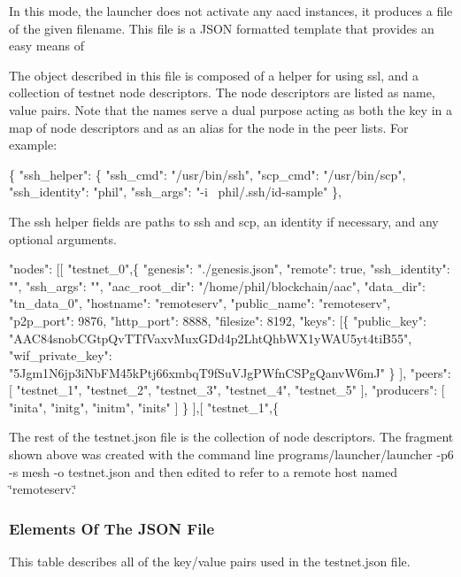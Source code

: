 In this mode, the launcher does not activate any aacd instances, it produces a file of the given filename. This file is a J\+S\+ON formatted template that provides an easy means of

The object described in this file is composed of a helper for using ssl, and a collection of testnet node descriptors. The node descriptors are listed as name, value pairs. Note that the names serve a dual purpose acting as both the key in a map of node descriptors and as an alias for the node in the peer lists. For example\+:


\begin{DoxyCode}
\{
  "ssh\_helper": \{
    "ssh\_cmd": "/usr/bin/ssh",
    "scp\_cmd": "/usr/bin/scp",
    "ssh\_identity": "phil",
    "ssh\_args": "-i ~phil/.ssh/id-sample"
  \},
\end{DoxyCode}
 The ssh helper fields are paths to ssh and scp, an identity if necessary, and any optional arguments.


\begin{DoxyCode}
"nodes": [[
    "testnet\_0",\{
      "genesis": "./genesis.json",
      "remote": true,
      "ssh\_identity": "",
      "ssh\_args": "",
      "aac\_root\_dir": "/home/phil/blockchain/aac",
      "data\_dir": "tn\_data\_0",
      "hostname": "remoteserv",
      "public\_name": "remoteserv",
      "p2p\_port": 9876,
      "http\_port": 8888,
      "filesize": 8192,
      "keys": [\{
          "public\_key": "AAC84snobCGtpQvTTfVaxvMuxGDd4p2LhtQhbWX1yWAU5yt4tiB55",
          "wif\_private\_key": "5Jgm1N6jp3iNbFM45kPtj66xmbqT9fSuVJgPWfnCSPgQanvW6mJ"
        \}
      ],
      "peers": [
        "testnet\_1",
        "testnet\_2",
        "testnet\_3",
        "testnet\_4",
        "testnet\_5"
      ],
      "producers": [
        "inita",
        "initg",
        "initm",
        "inits"
      ]
    \}
  ],[
    "testnet\_1",\{
\end{DoxyCode}


The rest of the testnet.\+json file is the collection of node descriptors. The fragment shown above was created with the command line {\ttfamily programs/launcher/launcher -\/p6 -\/s mesh -\/o testnet.\+json} and then edited to refer to a remote host named \char`\"{}remoteserv.\char`\"{}

\subsubsection*{Elements Of The J\+S\+ON File}

This table describes all of the key/value pairs used in the testnet.\+json file.

